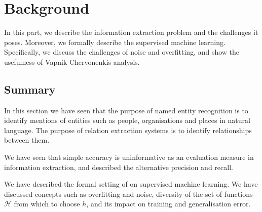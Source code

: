 \chapter{Background}
\label{background}

In this part, we describe the information extraction problem and the challenges it poses. Moreover, we formally describe the supervised machine learning. Specifically, we discuss the challenges of noise and overfitting, and show the usefulness of Vapnik-Chervonenkis analysis.




\section{Summary}
In this section we have seen that the purpose of named entity recognition is to identify mentions of entities such as people, organisations and places in natural language. The purpose of relation extraction systems is to identify relationships between them. 

We have seen that simple accuracy is uninformative as an evaluation measure in information extraction, and described the alternative precision and recall.

We have described the formal setting of on supervised machine learning. We have discussed concepts such as overfitting and noise, diversity of the set of functions $\mathcal{H}$ from which to choose $h$, and its impact on training and generalisation error.
